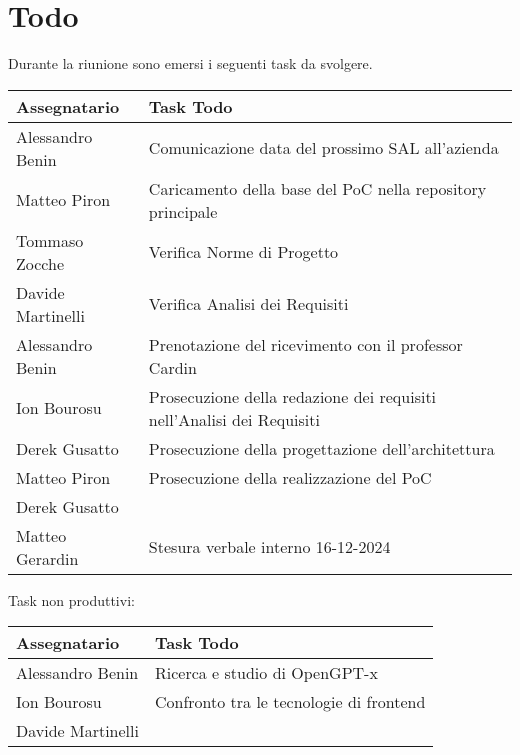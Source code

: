 \section{Todo}
Durante la riunione sono emersi i seguenti task da svolgere.

\begin{center}
  \begin{tabular}{|L{5cm}|L{8cm}|}
    \hline
    \textbf{Assegnatario} & \textbf{Task Todo} \\ \hline
    Alessandro Benin & Comunicazione data del prossimo SAL all'azienda \\ \hline
    Matteo Piron & Caricamento della base del PoC nella repository principale \\ \hline
    Tommaso Zocche & Verifica Norme di Progetto \\ \hline
    Davide Martinelli & Verifica Analisi dei Requisiti \\ \hline
    Alessandro Benin & Prenotazione del ricevimento con il professor Cardin \\ \hline
    Ion Bourosu & Prosecuzione della redazione dei requisiti nell'Analisi dei Requisiti \\ \hline
    Derek Gusatto & Prosecuzione della progettazione dell'architettura \\ \hline
    Matteo Piron & Prosecuzione della realizzazione del PoC \\ 
    Derek Gusatto & \\ \hline
    Matteo Gerardin & Stesura verbale interno 16-12-2024 \\ \hline
  \end{tabular}
\end{center}

Task non produttivi:

\begin{center}
  \begin{tabular}{|L{5cm}|L{8cm}|}
    \hline
    \textbf{Assegnatario} & \textbf{Task Todo} \\ \hline
    Alessandro Benin & Ricerca e studio di OpenGPT-x \\ \hline
    Ion Bourosu & Confronto tra le tecnologie di frontend \\
    Davide Martinelli & \\ \hline
  \end{tabular}
\end{center}
